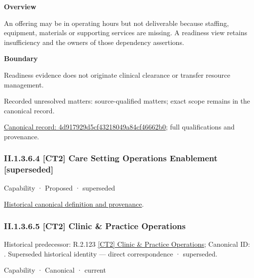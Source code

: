 \textbf{Overview}



An offering may be in operating hours but not deliverable because staffing, equipment, materials or supporting services are missing. A readiness view retains insufficiency and the owners of those dependency assertions.



\textbf{Boundary}



Readiness evidence does not originate clinical clearance or transfer resource management.


{\small Recorded unresolved matters: source-qualified matters; exact scope remains in the canonical record.}\par
{\footnotesize \href{../../../../continuum/strategy/capability/feature/4d917929d5cf43218049a84cf46662b0.md}{Canonical record: 4d917929d5cf43218049a84cf46662b0}; full qualifications and provenance.}\par
\subsubsection*{II.1.3.6.4 [CT2] Care Setting Operations Enablement [superseded]}
\label{navigation:II.1.3.6.4}

\label{element:a03741e6e98642bea44680d23fdcb434}
{\small Capability · Proposed · superseded}\par
\href{../../../../continuum/strategy/capability/a03741e6e98642bea44680d23fdcb434.md}{Historical canonical definition and provenance}.\par
\subsubsection*{II.1.3.6.5 [CT2] Clinic \& Practice Operations}
\label{navigation:II.1.3.6.5}

{\small Historical predecessor: R.2.123 \hyperref[element:0856d2daf2ba4b92b5390b38b98efb54]{[CT2] Clinic \& Practice Operations}; Canonical ID: \texttt{}. Superseded historical identity — direct correspondence · superseded.}\par
\label{element:3dffe63e03124efab255204ee4e9a5d9}
{\small Capability · Canonical · current}\par

